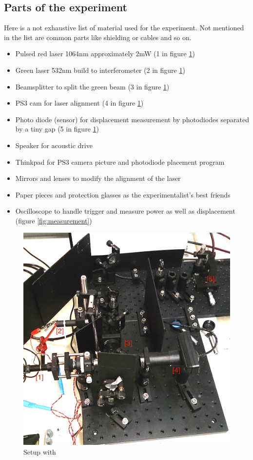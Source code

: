\documentclass[12pt,a4paper]{article}
\begin{document}
\subsection{Parts of the experiment}
Here is a not exhaustive list of material used for the experiment. Not mentioned in the list are common parts like shielding or cables and so on.
\begin{itemize} 
	\item Pulsed red laser 1064nm approximately 2mW (1 in figure \ref{fig:setup})
	\item Green laser 532nm build to interferometer (2 in figure \ref{fig:setup})
	\item Beamsplitter to split the green beam (3 in figure \ref{fig:setup})
	\item PS3 cam for laser alignment (4 in figure \ref{fig:setup})
	\item Photo diode (sensor) for displacement measurement by photodiodes separated by a tiny gap (5 in figure \ref{fig:setup})
	\item Speaker for acoustic drive 
	\item Thinkpad for PS3 camera picture and photodiode placement program
	\item Mirrors and lenses to modify the alignment of the laser
	\item Paper pieces and protection glasses as the experimentalist's best friends
	\item Oscilloscope to handle trigger and measure power as well as displacement (figure \ref{fig:measurement})
\end{itemize}

\begin{figure}[H]
	\centering
	\includegraphics[scale=0.4]{../figures/aufbau.png}
	\caption{Setup with}
	\label{fig:setup}
\end{figure} 
\end{document}
